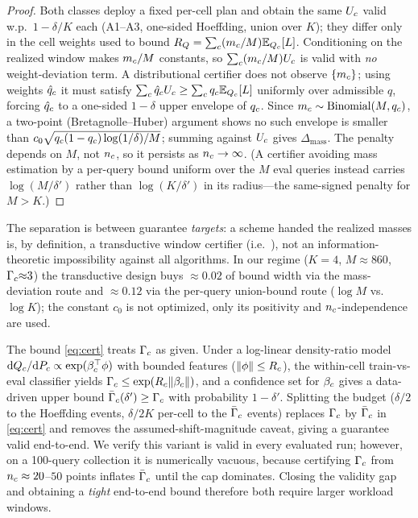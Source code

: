 \begin{proof}
Both classes deploy a fixed per-cell plan and obtain the same $U_c$ valid w.p.\ $1-\delta/K$ each (A1--A3, one-sided Hoeffding, union over $K$); they differ only in the cell weights used to bound $R_Q=\sum_c(m_c/M)\mathbb{E}_{Q_c}[L]$. Conditioning on the realized window makes $m_c/M$ constants, so $\sum_c(m_c/M)U_c$ is valid with \emph{no} weight-deviation term. A distributional certifier does not observe $\{m_c\}$; using weights $\hat q_c$ it must satisfy $\sum_c\hat q_c U_c\ge\sum_c q_c\mathbb{E}_{Q_c}[L]$ uniformly over admissible $q$, forcing $\hat q_c$ to a one-sided $1-\delta$ upper envelope of $q_c$. Since $m_c\sim\mathrm{Binomial}(M,q_c)$, a two-point (Bretagnolle--Huber) argument shows no such envelope is smaller than $c_0\sqrt{q_c(1-q_c)\log(1/\delta)/M}$; summing against $U_c$ gives $\Delta_{\mathrm{mass}}$. The penalty depends on $M$, not $n_c$, so it persists as $n_c\to\infty$. (A certifier avoiding mass estimation by a per-query bound uniform over the $M$ eval queries instead carries $\log(M/\delta')$ rather than $\log(K/\delta')$ in its radius---the same-signed penalty for $M{>}K$.)
\end{proof}

\noindent The separation is between guarantee \emph{targets}: a scheme handed the realized masses is, by definition, a transductive window certifier (i.e.\ \CWC{}), not an information-theoretic impossibility against all algorithms. In our regime ($K{=}4$, $M{\approx}860$, $\Gamma_c{\approx}3$) the transductive design buys $\approx0.02$ of bound width via the mass-deviation route and $\approx0.12$ via the per-query union-bound route ($\log M$ vs.\ $\log K$); the constant $c_0$ is not optimized, only its positivity and $n_c$-independence are used.

\begin{remark}
\label{rem:rho-ucb}
The bound \eqref{eq:cert} treats $\Gamma_c$ as given. Under a log-linear density-ratio model $\mathrm dQ_c/\mathrm dP_c\propto\exp(\beta_c^\top\phi)$ with bounded features ($\lVert\phi\rVert\le R_c$), the within-cell train-vs-eval classifier yields $\Gamma_c\le\exp(R_c\lVert\beta_c\rVert)$, and a confidence set for $\beta_c$ gives a data-driven upper bound $\bar\Gamma_c(\delta')\ge\Gamma_c$ with probability $1-\delta'$. Splitting the budget ($\delta/2$ to the Hoeffding events, $\delta/2K$ per-cell to the $\bar\Gamma_c$ events) replaces $\Gamma_c$ by $\bar\Gamma_c$ in \eqref{eq:cert} and removes the assumed-shift-magnitude caveat, giving a guarantee valid end-to-end. We verify this variant is valid in every evaluated run; however, on a 100-query collection it is numerically vacuous, because certifying $\Gamma_c$ from $n_c\approx 20$--$50$ points inflates $\bar\Gamma_c$ until the cap dominates. Closing the validity gap and obtaining a \emph{tight} end-to-end bound therefore both require larger workload windows.
\end{remark}
